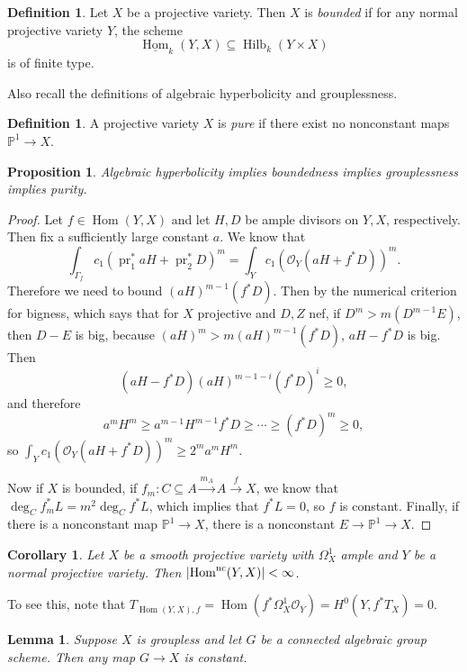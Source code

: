 \documentclass[leqno, openany]{memoir}
\newtheorem{cor}[thm]{Corollary}
\newtheorem{prop}[thm]{Proposition}
\newtheorem{lem}[thm]{Lemma}
\theoremstyle{definition}
\newtheorem{defn}[thm]{Definition}
\theoremstyle{remark}
\theoremstyle{plain}
\theoremstyle{definition}
\theoremstyle{remark}
\renewcommand{\P}{\mathbb{P}}
\newcommand{\mc}[1]{\mathcal{#1}}
\newcommand{\mr}[1]{\mathrm{#1}}
\newcommand{\on}[1]{\operatorname{#1}}
\newcommand{\ul}[1]{\underline{#1}}
\DeclareMathOperator{\Hom}{Hom}
\begin{document}
\begin{defn}
    Let $X$ be a projective variety. Then $X$ is \textit{bounded} if for any normal projective variety $Y$, the scheme
    \[ \ul{\Hom}_k(Y, X) \subseteq \on{Hilb}_k(Y \times X) \]
    is of finite type.
\end{defn}

Also recall the definitions of algebraic hyperbolicity and grouplessness.

\begin{defn}
    A projective variety $X$ is \textit{pure} if there exist no nonconstant maps $\P^1 \to X$.
\end{defn}

\begin{prop}
    Algebraic hyperbolicity implies boundedness implies grouplessness implies purity.
\end{prop}

\begin{proof}
    Let $f \in \Hom(Y, X)$ and let $H, D$ be ample divisors on $Y, X$, respectively. Then fix a sufficiently large constant $a$. We know that
    \[ \int_{\Gamma_f} c_1(\on{pr}_1^* a H + \on{pr}_2^* D)^m = \int_Y c_1(\mc{O}_Y(aH + f^* D))^m. \]
    Therefore we need to bound $(aH)^{m-1} (f^* D)$. Then by the numerical criterion for bigness, which says that for $X$ projective and $D, Z$ nef, if $D^m > m (D^{m-1} E)$, then $D-E$ is big, because $(aH)^m > m (aH)^{m-1} (f^* D)$, $aH - f^* D$ is big. Then
    \[ (aH - f^* D) (aH)^{m-1-i} (f^* D)^i \geq 0, \]
    and therefore
    \[ a^m H^m \geq a^{m-1} H^{m-1} f^* D \geq \cdots \geq (f^* D)^m \geq 0, \]
    so $\int_Y c_1(\mc{O}_Y(aH + f^* D))^m \geq 2^m a^m H^m$.

    Now if $X$ is bounded, if $f_m \colon C \subseteq A \xrightarrow{m_A} A \xrightarrow{f} X$, we know that $\deg_C f_m^* L = m^2 \deg_C f^* L$, which implies that $f^* L = 0$, so $f$ is constant. Finally, if there is a nonconstant map $\P^1 \to X$, there is a nonconstant $E \to \P^1 \to X$.
\end{proof}

\begin{cor}
    Let $X$ be a smooth projective variety with $\Omega_X^1$ ample and $Y$ be a normal projective variety. Then $\abs{\Hom^{\mr{nc}}(Y, X)} < \infty$.
\end{cor}

To see this, note that $T_{\Hom(Y, X), f} = \Hom(f^* \Omega_X^1 \mc{O}_Y) = H^0(Y, f^* T_X) = 0$.

\begin{lem}
    Suppose $X$ is groupless and let $G$ be a connected algebraic group scheme. Then any map $G \to X$ is constant.
\end{lem}
\end{document}
